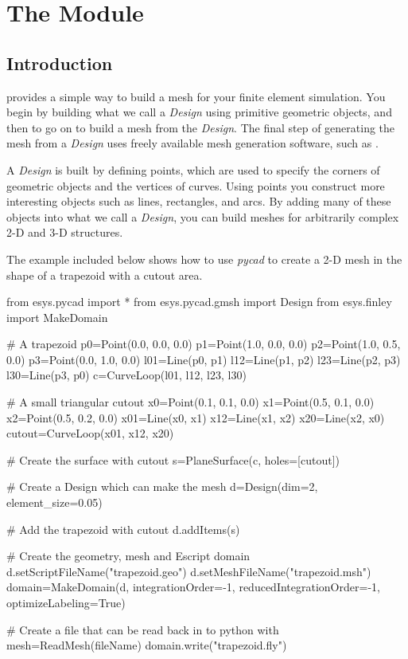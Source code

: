 \chapter{The Module \pycad} \label{PYCAD CHAP}


\section{Introduction}

\pycad provides a simple way to build a mesh for your finite element
simulation.  You begin by building what we call a {\it Design} using
primitive geometric objects, and then to go on to build a mesh from
the {\it Design}.  The final step of generating the mesh from a {\it
Design} uses freely available mesh generation software, such as \gmshextern.

A {\it Design} is built by defining points, which are used to specify
the corners of geometric objects and the vertices of curves.  Using
points you construct more interesting objects such as lines,
rectangles, and arcs.  By adding many of these objects into what we
call a {\it Design}, you can build meshes for arbitrarily complex 2-D
and 3-D structures.

The example included below shows how to use {\it pycad} to create a 2-D mesh
in the shape of a trapezoid with a cutout area.

\begin{python}
	from esys.pycad import *
	from esys.pycad.gmsh import Design
	from esys.finley import MakeDomain

	# A trapezoid
	p0=Point(0.0, 0.0, 0.0)
	p1=Point(1.0, 0.0, 0.0)
	p2=Point(1.0, 0.5, 0.0)
	p3=Point(0.0, 1.0, 0.0)
	l01=Line(p0, p1)
	l12=Line(p1, p2)
	l23=Line(p2, p3)
	l30=Line(p3, p0)
	c=CurveLoop(l01, l12, l23, l30)

	# A small triangular cutout
	x0=Point(0.1, 0.1, 0.0)
	x1=Point(0.5, 0.1, 0.0)
	x2=Point(0.5, 0.2, 0.0)
	x01=Line(x0, x1)
	x12=Line(x1, x2)
	x20=Line(x2, x0)
	cutout=CurveLoop(x01, x12, x20)

	# Create the surface with cutout
	s=PlaneSurface(c, holes=[cutout])

	# Create a Design which can make the mesh
	d=Design(dim=2, element_size=0.05)

	# Add the trapezoid with cutout
	d.addItems(s)

	# Create the geometry, mesh and Escript domain
	d.setScriptFileName("trapezoid.geo")
	d.setMeshFileName("trapezoid.msh")
	domain=MakeDomain(d, integrationOrder=-1, reducedIntegrationOrder=-1, optimizeLabeling=True)

	# Create a file that can be read back in to python with mesh=ReadMesh(fileName)
	domain.write("trapezoid.fly")
\end{python}

